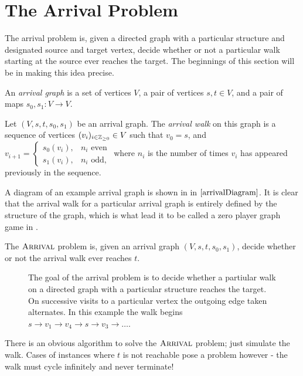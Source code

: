 \section{The Arrival Problem}
The arrival problem is, given a directed graph with
a particular structure and designated source and target vertex,
decide whether or not a particular walk starting at the source
ever reaches the target. The beginnings of this section will be
in making this idea precise.
\begin{definition}
  An \emph{arrival graph} is a set of vertices $V$, a pair of
  vertices $s, t \in V$, and a pair of maps 
  $s_0, s_1 : V \to V$. 
\end{definition}
\begin{definition}
  Let $(V, s, t, s_0, s_1)$ be an arrival graph. The \emph{arrival walk}
  on this graph is a sequence of vertices $(v_i)_{i \in \mathbb{Z}_{\geq 0}} \in V$
  such that $v_0 = s$, and $v_{i+1} = 
  \begin{cases} 
    s_0(v_i), & \text{$n_i$ even}\\  
    s_1(v_i), & \text{$n_i$ odd},
  \end{cases}$
  where $n_i$ is the number of times $v_i$ has appeared previously in
  the sequence.
\end{definition}
 A diagram of an example arrival graph is shown in 
in $\cref{arrivalDiagram}$.
It is clear that the arrival walk for a particular arrival graph
is entirely defined by the structure of the graph, which is what
lead it to be called a zero player graph game in \citep{arrivalBasic}.
\begin{definition}
  The $\textsc{Arrival}$ problem is, given an arrival graph $(V, s, t, s_0, s_1)$,
  decide whether or not the arrival walk ever reaches $t$.
\end{definition}
\begin{figure}[h]
  \centering
  
  \caption{The goal of the arrival problem is to decide whether a partiular walk on a directed graph with a particular
  structure reaches the target. On successive visits to a particular
  vertex the outgoing edge taken alternates. In this example
  the walk begins $s \to v_1 \to v_4 \to s \to v_3 \to \ldots$.} \label{arrivalDiagram}
\end{figure}
There is an obvious algorithm to solve the $\textsc{Arrival}$ problem;
just simulate the walk. Cases of instances where $t$ is not reachable pose a problem however -
the walk must cycle infinitely and never terminate!
